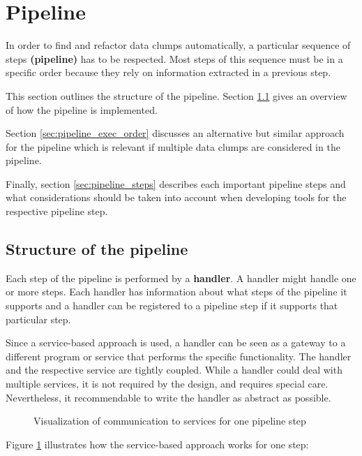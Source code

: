 

\section{Pipeline}\label{sec:pipeline}
In order to find and refactor data clumps automatically, a particular sequence of steps \textbf{(pipeline)} has to be respected. Most steps of this sequence must be in a specific order because they rely on information extracted in a previous step. 

This section outlines the structure of the pipeline. Section \ref{sec:pipeline_structure} gives an overview of how the pipeline is implemented. 

Section \ref{sec:pipeline_exec_order} discusses an alternative but similar approach for the pipeline which is relevant if multiple data clumps are considered in the pipeline. 

Finally, section \ref{sec:pipeline_steps} describes each important pipeline steps and what considerations should be taken into account when developing tools for the respective pipeline step. 


\subsection{Structure of the pipeline}\label{sec:pipeline_structure}
Each step of the pipeline is performed by a  \textbf{handler}. A handler might handle one or more steps.  Each handler has information about what steps of the pipeline it supports and  a handler can be registered to a pipeline step if it supports that particular step.  

Since a service-based approach is used, a handler can be seen as a gateway to a different program or service that performs the specific functionality.  The handler and the respective service are tightly coupled. While a handler could deal with multiple services, it is not required by the design, and requires special care. Nevertheless, it recommendable to write the handler as abstract as possible.
\begin{figure}[ht!]
    \centering
    
    \caption{Visualization of communication to services for one pipeline step}
    \label{fig:solver_gateway_service_overview}
\end{figure}

Figure \ref{fig:solver_gateway_service_overview} illustrates how the service-based approach works for one step:

